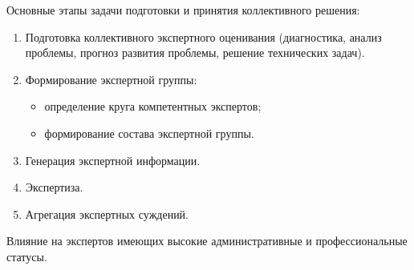 
Основные этапы задачи подготовки и принятия коллективного решения:
\begin{enumerate}
    \item Подготовка коллективного экспертного оценивания (диагностика, анализ проблемы, прогноз развития проблемы, решение технических задач).
    \item Формирование экспертной группы:
    \begin{itemize}
        \item определение круга компетентных экспертов;
        \item формирование состава экспертной группы.
    \end{itemize}
    \item Генерация экспертной информации.
    \item Экспертиза.
    \item Агрегация экспертных суждений.
\end{enumerate}

Влияние на экспертов имеющих высокие административные и профессиональные статусы. 
